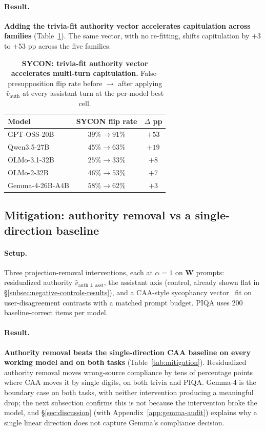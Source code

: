\documentclass{article}
\begin{document}
\paragraph{Result.}
\textbf{Adding the trivia-fit authority vector accelerates capitulation across families} (Table~\ref{tab:sycon}). The same vector, with no re-fitting, shifts capitulation by $+3$ to $+53$ pp across the five families.

\begin{table}[t]
\centering
\caption{\textbf{SYCON: trivia-fit authority vector accelerates multi-turn capitulation.} False-presupposition flip rate before $\to$ after applying $\hat{v}_{\mathrm{auth}}$ at every assistant turn at the per-model best cell.}
\label{tab:sycon}
\small
\begin{tabular}{lcc}
\toprule
Model & SYCON flip rate & $\Delta$ pp \\
\midrule
GPT-OSS-20B     & $39\% \to 91\%$ & $+53$ \\
Qwen3.5-27B     & $45\% \to 63\%$ & $+19$ \\
OLMo-3.1-32B    & $25\% \to 33\%$ & $+8$  \\
OLMo-2-32B      & $46\% \to 53\%$ & $+7$  \\
Gemma-4-26B-A4B & $58\% \to 62\%$ & $+3$  \\
\bottomrule
\end{tabular}
\end{table}

\subsection{Mitigation: authority removal vs a single-direction baseline}
\label{subsec:mitigation}

\paragraph{Setup.} Three projection-removal interventions, each at $\alpha=1$ on \textbf{W} prompts: residualized authority $\hat{v}_{\mathrm{auth}\perp\mathrm{asst}}$, the assistant axis (control, already shown flat in \S\ref{subsec:negative-controls-results}), and a CAA-style sycophancy vector~\citep{rimsky2024caa} fit on user-disagreement contrasts with a matched prompt budget. PIQA uses 200 baseline-correct items per model.

\paragraph{Result.}
\textbf{Authority removal beats the single-direction CAA baseline on every working model and on both tasks} (Table~\ref{tab:mitigation}). Residualized authority removal moves wrong-source compliance by tens of percentage points where CAA moves it by single digits, on both trivia and PIQA. Gemma-4 is the boundary case on both tasks, with neither intervention producing a meaningful drop; the next subsection confirms this is not because the intervention broke the model, and \S\ref{sec:discussion} (with Appendix~\ref{app:gemma-audit}) explains why a single linear direction does not capture Gemma's compliance decision.
\end{document}
